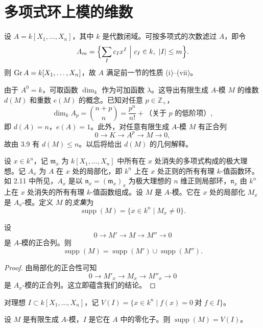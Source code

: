 \section{多项式环上模的维数}

设 $A=k[X_1,\dots,X_n]$，其中 $k$ 是代数闭域。可按多项式的次数滤过 $A$，即令
$$A_m=\Bigl\{\sum_I c_I x^I\ \Big|\ c_I\in k,\ |I|\le m\Bigr\}.$$
则 $\operatorname{Gr} A=k[X_1,\dots,X_n]$，故 $A$ 满足前一节的性质 (i)--(vii)。

由于 $A^0=k$，可取函数 $\dim_k$ 作为可加函数 $\lambda$。这导出有限生成 $A$-模 $M$ 的维数 $d(M)$ 和重数 $e(M)$ 的概念。已知对任意 $p\in\mathbb{Z}_+$，
$$\dim_k A_p=\binom{n+p}{n}=\frac{p^n}{n!}+\text{（关于 $p$ 的低阶项）},$$
即 $d(A)=n$，$e(A)=1$。此外，对任意有限生成 $A$-模 $M$ 有正合列
$$0\longrightarrow K\longrightarrow A^p\longrightarrow M\longrightarrow 0,$$
故由 3.9 有 $d(M)\le n$。以后将给出 $d(M)$ 的几何解释。

设 $x\in k^n$，记 $\mathfrak{m}_x$ 为 $k[X_1,\dots,X_n]$ 中所有在 $x$ 处消失的多项式构成的极大理想。记 $A_x$ 为 $A$ 在 $x$ 处的局部化，即 $k^n$ 上在 $x$ 处正则的所有有理 $k$-值函数环。如 2.11 中所见，$A_x$ 是以 $\mathfrak{n}_x=(\mathfrak{m}_x)_x$ 为极大理想的 $n$ 维正则局部环，$\mathfrak{n}_x$ 由 $k^n$ 上在 $x$ 处消失的所有有理 $k$-值函数组成。设 $M$ 是 $A$-模。它在 $x$ 处的局部化 $M_x$ 是 $A_x$-模。定义 $M$ 的\emph{支集}为
$$\operatorname{supp}(M)=\{x\in k^n\mid M_x\neq 0\}.$$

\begin{lemma}
设
$$0\longrightarrow M'\longrightarrow M\longrightarrow M''\longrightarrow 0$$
是 $A$-模的正合列。则
$$\operatorname{supp}(M)=\operatorname{supp}(M')\cup\operatorname{supp}(M'').$$
\end{lemma}

\begin{proof}
由局部化的正合性可知
$$0\longrightarrow M'_x\longrightarrow M_x\longrightarrow M''_x\longrightarrow 0$$
是 $A_x$-模的正合列。这立即蕴含我们的结论。
\end{proof}

对理想 $I\subset k[X_1,\dots,X_n]$，记 $V(I)=\{x\in k^n\mid f(x)=0\ \text{对 }f\in I\}$。

\begin{proposition}
设 $M$ 是有限生成 $A$-模，$I$ 是它在 $A$ 中的零化子。则 $\operatorname{supp}(M)=V(I)$。
\end{proposition}

